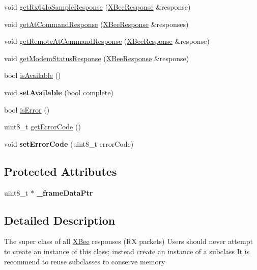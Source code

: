 \begin{DoxyCompactItemize}
\item 
void \hyperlink{class_x_bee_response_ae298de16ed0dce349154ae87f8b93d77}{get\+Rx64\+Io\+Sample\+Response} (\hyperlink{class_x_bee_response}{X\+Bee\+Response} \&response)
\item 
void \hyperlink{class_x_bee_response_a5177bb036ccaa6ea30d73541a3e7d414}{get\+At\+Command\+Response} (\hyperlink{class_x_bee_response}{X\+Bee\+Response} \&responses)
\item 
void \hyperlink{class_x_bee_response_af359dab94c57006a0fb4b58986744c04}{get\+Remote\+At\+Command\+Response} (\hyperlink{class_x_bee_response}{X\+Bee\+Response} \&response)
\item 
void \hyperlink{class_x_bee_response_ad93317521b52825c32b43d34a0f189d1}{get\+Modem\+Status\+Response} (\hyperlink{class_x_bee_response}{X\+Bee\+Response} \&response)
\item 
bool \hyperlink{class_x_bee_response_ab60b2cc9e32fa88dee132f410cc8331d}{is\+Available} ()
\item 
\hypertarget{class_x_bee_response_a1814031d09ed316de9f983bd367f3ae4}{}\label{class_x_bee_response_a1814031d09ed316de9f983bd367f3ae4} 
void {\bfseries set\+Available} (bool complete)
\item 
bool \hyperlink{class_x_bee_response_a68cbc45004ff4314161b0fb1cc579b9b}{is\+Error} ()
\item 
uint8\+\_\+t \hyperlink{class_x_bee_response_a2895438378d2738e3efe74b1c838170b}{get\+Error\+Code} ()
\item 
\hypertarget{class_x_bee_response_a95749b78c9807e8f403abf1620ab29c1}{}\label{class_x_bee_response_a95749b78c9807e8f403abf1620ab29c1} 
void {\bfseries set\+Error\+Code} (uint8\+\_\+t error\+Code)
\end{DoxyCompactItemize}
\subsection*{Protected Attributes}
\begin{DoxyCompactItemize}
\item 
\hypertarget{class_x_bee_response_af62a61818a476f4815d93f9c3485e6e7}{}\label{class_x_bee_response_af62a61818a476f4815d93f9c3485e6e7} 
uint8\+\_\+t $\ast$ {\bfseries \+\_\+frame\+Data\+Ptr}
\end{DoxyCompactItemize}


\subsection{Detailed Description}
The super class of all \hyperlink{class_x_bee}{X\+Bee} responses (RX packets) Users should never attempt to create an instance of this class; instead create an instance of a subclass It is recommend to reuse subclasses to conserve memory 

